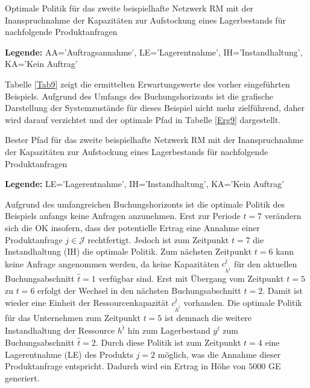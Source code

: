 \begin{table}
\begin{footnotesize}
    \caption{Optimale Politik für das zweite beispielhafte Netzwerk RM mit der Inanspruchnahme der Kapazitäten zur Aufstockung eines Lagerbestands für nachfolgende Produktanfragen} \label{Tab9}
    \vspace*{3mm}
        \begin{center}
      \end{center}
    \begin{center}
      {\footnotesize \textbf{Legende:} AA='Auftragsannahme', LE='Lagerentnahme', IH='Instandhaltung', KA='Kein Auftrag'} 
      \end{center}
\end{footnotesize}
\end{table}

Tabelle \ref{Tab9} zeigt die ermittelten Erwartungswerte des vorher eingeführten Beispiels. Aufgrund des Umfangs des Buchungshorizonts ist die grafische Darstellung der Systemzustände für dieses Beispiel nicht mehr zielführend, daher wird darauf verzichtet und der optimale Pfad in Tabelle \ref{Erg9} dargestellt.

\begin{table}
\begin{footnotesize}
    \caption{Bester Pfad für das zweite beispielhafte Netzwerk RM mit der Inanspruchnahme der Kapazitäten zur Aufstockung eines Lagerbestands für nachfolgende Produktanfragen} \label{Erg9}
    \vspace*{3mm}
        \begin{center}
      \end{center}
    \begin{center}
      {\footnotesize \textbf{Legende:} LE='Lagerentnahme', IH='Instandhaltung', KA='Kein Auftrag'} 
      \end{center}
\end{footnotesize}
\end{table}

Aufgrund des umfangreichen Buchungshorizonts ist die optimale Politik des Beispiels anfangs keine Anfragen anzunehmen. Erst zur Periode $t=7$ verändern sich die OK insofern, dass der potentielle Ertrag eine Annahme einer Produktanfrage $j\in\mathcal{J}$ rechtfertigt. Jedoch ist zum Zeitpunkt $t=7$ die Instandhaltung (IH) die optimale Politik. Zum nächsten Zeitpunkt $t=6$ kann keine Anfrage angenommen werden, da keine Kapazitäten $c^{\hat{t}}_{h^{\hat t}}$ für den aktuellen Buchungsabschnitt $\hat{t}=1$ verfügbar sind. Erst mit Übergang vom Zeitpunkt $t=5$ zu $t=6$ erfolgt der Wechsel in den nächsten Buchungsabschnitt $\hat{t}=2$. Damit ist wieder eine Einheit der Ressourcenkapazität $c^{\hat{t}}_{h^{\hat{t}}}$ vorhanden. Die optimale Politik für das Unternehmen zum Zeitpunkt $t=5$ ist demnach die weitere Instandhaltung der Ressource $h^{\hat{t}}$ hin zum Lagerbestand $y^{\hat{t}}$ zum Buchungsabschnitt $\hat{t}=2$. Durch diese Politik ist zum Zeitpunkt $t=4$ eine Lagerentnahme (LE) des Produkts $j=2$ möglich, was die Annahme dieser Produktanfrage entspricht. Dadurch wird ein Ertrag in Höhe von $5000$ GE generiert.

